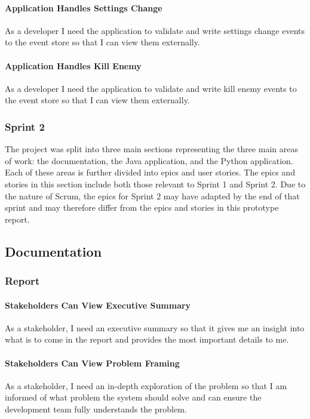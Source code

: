 \paragraph{Application Handles Settings Change}
As a developer I need the application to validate and write settings change events to the event store so that I can view them externally.

\paragraph{Application Handles Kill Enemy}
As a developer I need the application to validate and write kill enemy events to the event store so that I can view them externally.

\subsubsection{Sprint 2}

The project was split into three main sections representing the three main areas of work: the documentation, the Java application, and the Python application. Each of these areas is further divided into epics and user stories. The epics and stories in this section include both those relevant to Sprint 1 and Sprint 2. Due to the nature of Scrum, the epics for Sprint 2 may have adapted by the end of that sprint and may therefore differ from the epics and stories in this prototype report.

\subsection{Documentation}

\subsubsection{Report}

\paragraph{Stakeholders Can View Executive Summary}
As a stakeholder, I need an executive summary so that it gives me an insight into what is to come in the report and provides the most important details to me.

\paragraph{Stakeholders Can View Problem Framing}
As a stakeholder, I need an in-depth exploration of the problem so that I am informed of what problem the system should solve and can ensure the development team fully understands the problem.

